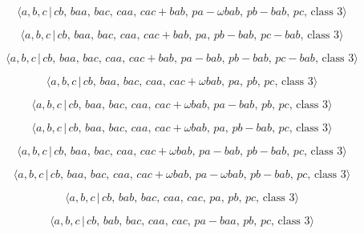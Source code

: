 \documentclass[10pt]{article}
\begin{document}
\begin{equation}
\langle a,b,c\,|\,cb,\,baa,\,bac,\,caa,\,cac+bab,\,pa-\omega
bab,\,pb-bab,\,pc,\,\text{class }3\rangle  \tag{6.248}
\end{equation}

\begin{equation}
\langle a,b,c\,|\,cb,\,baa,\,bac,\,caa,\,cac+bab,\,pa,\,pb-bab,\,pc-bab,\,%
\text{class }3\rangle  \tag{6.249}
\end{equation}

\begin{equation}
\langle
a,b,c\,|\,cb,\,baa,\,bac,\,caa,\,cac+bab,\,pa-bab,\,pb-bab,\,pc-bab,\,\text{
class }3\rangle  \tag{6.250}
\end{equation}

\begin{equation}
\langle a,b,c\,|\,cb,\,baa,\,bac,\,caa,\,cac+\omega bab,\,pa,\,pb,\,pc,\,%
\text{class }3\rangle  \tag{6.251}
\end{equation}

\begin{equation}
\langle a,b,c\,|\,cb,\,baa,\,bac,\,caa,\,cac+\omega bab,\,pa-bab,\,pb,\,pc,\,%
\text{class }3\rangle  \tag{6.252}
\end{equation}

\begin{equation}
\langle a,b,c\,|\,cb,\,baa,\,bac,\,caa,\,cac+\omega bab,\,pa,\,pb-bab,\,pc,\,%
\text{class }3\rangle  \tag{6.253}
\end{equation}

\begin{equation}
\langle a,b,c\,|\,cb,\,baa,\,bac,\,caa,\,cac+\omega
bab,\,pa-bab,\,pb-bab,\,pc,\,\text{class }3\rangle  \tag{6.254}
\end{equation}

\begin{equation}
\langle a,b,c\,|\,cb,\,baa,\,bac,\,caa,\,cac+\omega bab,\,pa-\omega
bab,\,pb-bab,\,pc,\,\text{class }3\rangle  \tag{6.255}
\end{equation}

\begin{equation}
\langle a,b,c\,|\,cb,\,bab,\,bac,\,caa,\,cac,\,pa,\,pb,\,pc,\,\text{class }%
3\rangle  \tag{6.256}
\end{equation}

\begin{equation}
\langle a,b,c\,|\,cb,\,bab,\,bac,\,caa,\,cac,\,pa-baa,\,pb,\,pc,\,\text{
class }3\rangle  \tag{6.257}
\end{equation}
\end{document}
